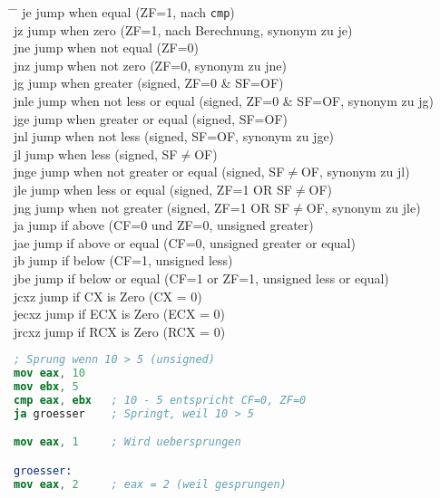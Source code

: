 \documentclass[a4paper,12pt,twoside]{article}
\begin{document}
\begin{tabbing}
  \hspace{2mm} \= \hspace{50mm} \= \kill 
  \> je \> jump when equal (ZF=1, nach \texttt{cmp}) \\ 
  \> jz \> jump when zero (ZF=1, nach Berechnung, synonym zu je) \\ 
  \> jne \> jump when not equal (ZF=0) \\ 
  \> jnz \> jump when not zero (ZF=0, synonym zu jne) \\ 
  \> jg \> jump when greater (signed, ZF=0 \& SF=OF) \\ 
  \> jnle \> jump when not less or equal (signed, ZF=0 \& SF=OF, synonym zu jg) \\ 
  \> jge \> jump when greater or equal (signed, SF=OF) \\ 
  \> jnl \> jump when not less (signed, SF=OF, synonym zu jge) \\ 
  \> jl \> jump when less (signed, SF$\neq$OF) \\ 
  \> jnge \> jump when not greater or equal (signed, SF$\neq$OF, synonym zu jl) \\ 
  \> jle \> jump when less or equal (signed, ZF=1 OR SF$\neq$OF) \\ 
  \> jng \> jump when not greater (signed, ZF=1 OR SF$\neq$OF, synonym zu jle) \\ 
  \> ja \> jump if above (CF=0 und ZF=0, unsigned greater) \\ 
  \> jae \> jump if above or equal (CF=0, unsigned greater or equal) \\ 
  \> jb \> jump if below (CF=1, unsigned less) \\ 
  \> jbe \> jump if below or equal (CF=1 or ZF=1, unsigned less or equal) \\
  \> jcxz \> jump if CX is Zero (CX = 0) \\
  \> jecxz \> jump if ECX is Zero (ECX = 0) \\
  \> jrcxz \> jump if RCX is Zero (RCX = 0) \\
\end{tabbing}
\begin{center}
  \begin{minipage}{1.0\textwidth}
    \begin{lstlisting}[language=NASM]
; Sprung wenn 10 > 5 (unsigned)
mov eax, 10
mov ebx, 5
cmp eax, ebx   ; 10 - 5 entspricht CF=0, ZF=0
ja groesser    ; Springt, weil 10 > 5

mov eax, 1     ; Wird uebersprungen

groesser:
mov eax, 2     ; eax = 2 (weil gesprungen)
    \end{lstlisting}
  \end{minipage}
\end{center}
\end{document}
